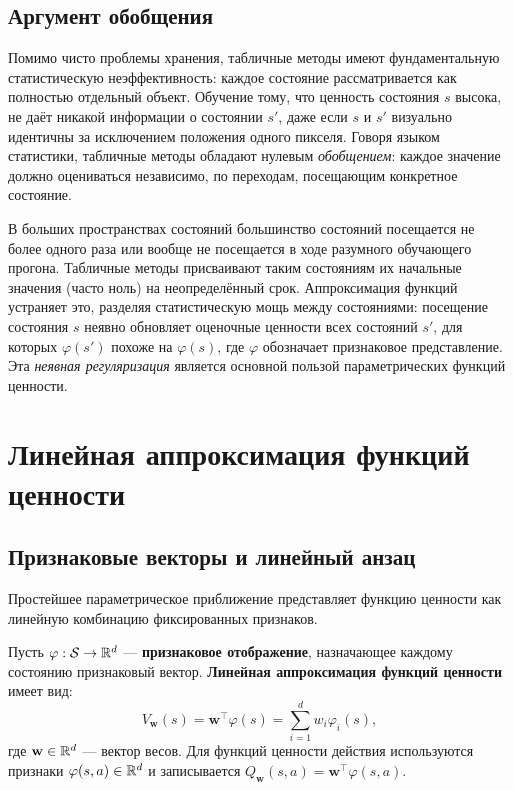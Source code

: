 \subsection{Аргумент обобщения}

Помимо чисто проблемы хранения, табличные методы имеют фундаментальную статистическую неэффективность: каждое состояние рассматривается как полностью отдельный объект.  Обучение тому, что ценность состояния $s$ высока, не даёт никакой информации о состоянии $s'$, даже если $s$ и $s'$ визуально идентичны за исключением положения одного пикселя.  Говоря языком статистики, табличные методы обладают нулевым \emph{обобщением}: каждое значение должно оцениваться независимо, по переходам, посещающим конкретное состояние.

В больших пространствах состояний большинство состояний посещается не более одного раза или вообще не посещается в ходе разумного обучающего прогона.  Табличные методы присваивают таким состояниям их начальные значения (часто ноль) на неопределённый срок.  Аппроксимация функций устраняет это, разделяя статистическую мощь между состояниями: посещение состояния $s$ неявно обновляет оценочные ценности всех состояний $s'$, для которых $\varphi(s')$ похоже на $\varphi(s)$, где $\varphi$ обозначает признаковое представление.  Эта \emph{неявная регуляризация} является основной пользой параметрических функций ценности.

\section{Линейная аппроксимация функций ценности}
\label{sec:linear-vfa}

\subsection{Признаковые векторы и линейный анзац}

Простейшее параметрическое приближение представляет функцию ценности как линейную комбинацию фиксированных признаков.

\begin{definition}
\label{def:linear-vfa}
Пусть $\varphi : \mathcal{S} \to \mathbb{R}^d$ --- \textbf{признаковое отображение}, назначающее каждому состоянию признаковый вектор.  \textbf{Линейная аппроксимация функций ценности} имеет вид:
\begin{equation}
\label{eq:linear-vfa}
V_\mathbf{w}(s) = \mathbf{w}^\top \varphi(s) = \sum_{i=1}^d w_i \varphi_i(s),
\end{equation}
где $\mathbf{w} \in \mathbb{R}^d$ --- вектор весов.  Для функций ценности действия используются признаки $\varphi(s, a) \in \mathbb{R}^d$ и записывается $Q_\mathbf{w}(s, a) = \mathbf{w}^\top \varphi(s, a)$.
\end{definition}

